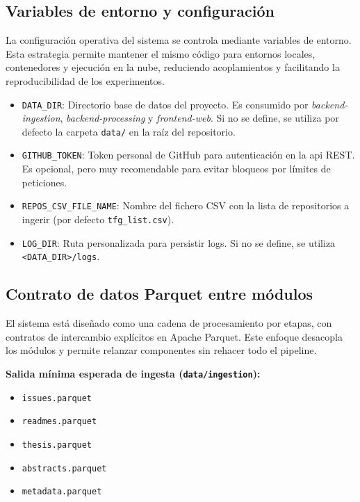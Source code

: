 \subsection{Variables de entorno y configuración}
La configuración operativa del sistema se controla mediante variables de
entorno. Esta estrategia permite mantener el mismo código para entornos
locales, contenedores y ejecución en la nube, reduciendo acoplamientos y
facilitando la reproducibilidad de los experimentos.

\begin{itemize}
    \item \texttt{DATA\_DIR}: Directorio base de datos del proyecto. Es consumido por \textit{backend-ingestion}, \textit{backend-processing} y \textit{frontend-web}. Si no se define, se utiliza por defecto la carpeta \texttt{data/} en la raíz del repositorio.
    \item \texttt{GITHUB\_TOKEN}: Token personal de GitHub para autenticación en la \acrshort{api} REST. Es opcional, pero muy recomendable para evitar bloqueos por límites de peticiones.
    \item \texttt{REPOS\_CSV\_FILE\_NAME}: Nombre del fichero CSV con la lista de repositorios a ingerir (por defecto \texttt{tfg\_list.csv}).
    \item \texttt{LOG\_DIR}: Ruta personalizada para persistir logs. Si no se define, se utiliza \texttt{<DATA\_DIR>/logs}.
\end{itemize}

\subsection{Contrato de datos Parquet entre módulos}
El sistema está diseñado como una cadena de procesamiento por etapas, con
contratos de intercambio explícitos en Apache Parquet. Este enfoque desacopla
los módulos y permite relanzar componentes sin rehacer todo el pipeline.

\textbf{Salida mínima esperada de ingesta (\texttt{data/ingestion}):}
\begin{itemize}
    \item \texttt{issues.parquet}
    \item \texttt{readmes.parquet}
    \item \texttt{thesis.parquet}
    \item \texttt{abstracts.parquet}
    \item \texttt{metadata.parquet}
\end{itemize}

